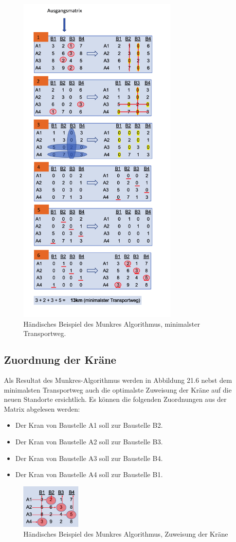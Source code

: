 \begin{figure}
\centering
\includegraphics[width=8cm]{papers/munkres/figures/Ungarische_Methode_Beispiel.png}
\caption{Händisches Beispiel des Munkres Algorithmus, minimalster Transportweg.}
\label{munkres:Vr2}
\end{figure}

\subsection{Zuordnung der Kräne
\label{munkres:subsection:malorum}}

Als Resultat des Munkres-Algorithmus werden in Abbildung 21.6 nebst dem minimalsten Transportweg auch die optimalste Zuweisung der Kräne auf die neuen Standorte ersichtlich.
Es können die folgenden Zuordnungen aus der Matrix abgelesen werden:
\begin{itemize}
\item Der Kran von Baustelle A1 soll zur Baustelle B2.
\item Der Kran von Baustelle A2 soll zur Baustelle B3.
\item Der Kran von Baustelle A3 soll zur Baustelle B4.
\item Der Kran von Baustelle A4 soll zur Baustelle B1.
\end{itemize}

\begin{figure}
\centering
\includegraphics[width=3cm]{papers/munkres/figures/Ungarische_Methode_Beispiel_Zuw.png}
\caption{Händisches Beispiel des Munkres Algorithmus, Zuweisung der Kräne }
\label{munkres:Vr2}
\end{figure} 